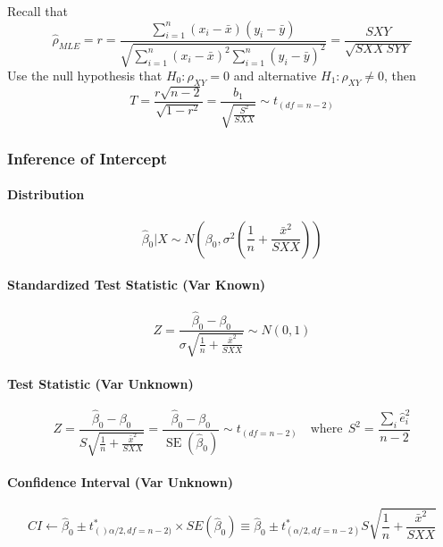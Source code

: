 \documentclass[10pt]{article}
\begin{document}
Recall that 
\begin{equation*}
    \hat{\rho}_{MLE} = r=\frac{\sum_{i=1}^{n}\left(x_{i}-\bar{x}\right)\left(y_{i}-\bar{y}\right)}{\sqrt{\sum_{i=1}^{n}\left(x_{i}-\bar{x}\right)^{2} \sum_{i=1}^{n}\left(y_{i}-\bar{y}\right)^{2}}} = \frac{SXY}{\sqrt{SXX~SYY}}
\end{equation*}
Use the null hypothesis that $H_0: \rho_{XY} = 0$ and alternative $H_1: \rho_{XY} \neq 0$, then
\begin{equation*}
    T=\frac{r \sqrt{n-2}}{\sqrt{1-r^{2}}}=\frac{b_{1}}{\sqrt{\frac{S^{2}}{S X X}}} \sim t_{(df = n-2)}
\end{equation*}


\subsubsection{Inference of Intercept}
\paragraph{Distribution}
\begin{equation*}
    \hat{\beta}_{0} | X \sim N\left(\beta_{0}, \sigma^{2}\left(\frac{1}{n}+\frac{\bar{x}^{2}}{S X X}\right)\right)
\end{equation*}
\paragraph{Standardized Test Statistic (Var Known)}
\begin{equation*}
    Z=\frac{\hat{\beta}_{0}-\beta_{0}}{\sigma \sqrt{\frac{1}{n}+\frac{\bar{x}^{2}}{S X X}}} \sim N(0,1)
\end{equation*}
\paragraph{Test Statistic (Var Unknown)}
\begin{equation*}
    Z=\frac{\hat{\beta}_{0}-\beta_{0}}{S \sqrt{\frac{1}{n}+\frac{\bar{x}^{2}}{S X X}}} = \frac{\hat{\beta}_{0}-\beta_{0}}{\operatorname{SE}\left(\hat{\beta}_{0}\right)} \sim t_{(df=n-2)} \quad \text{where}~~ S^2 = \frac{\sum_i \hat{e}_i^2}{n-2} 
\end{equation*}
\paragraph{Confidence Interval (Var Unknown)}
\begin{equation*}
    CI \gets \hat{\beta}_0 \pm t^\ast_{()\alpha/2, df=n-2)} \times SE(\hat{\beta}_0) \equiv \hat{\beta}_0 \pm t^\ast_{(\alpha/2, df=n-2)} S\sqrt{\frac{1}{n}+\frac{\bar{x}^{2}}{S X X}}
\end{equation*}
\end{document}
